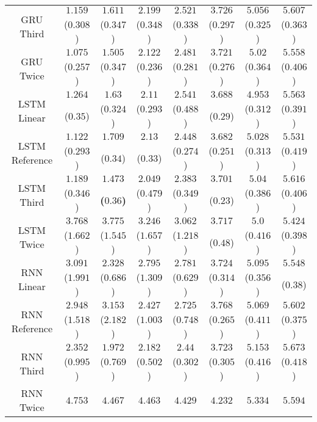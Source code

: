 \begin{table}[!ht]
{\begin{tabular}{|c|c|c|c|c|c|c|c|}
			\multirow{2}{*}{GRU Third} & $1.159$ & $1.611$ & $2.199$ & $2.521$ & $3.726$ & $5.056$ & $5.607$ \\
			 & ($0.308$) & ($0.347$) & ($0.348$) & ($0.338$) & ($0.297$) & ($0.325$) & ($0.363$) \\ \hline
			\multirow{2}{*}{GRU Twice} & $1.075$ & $1.505$ & $2.122$ & $2.481$ & $3.721$ & $5.02$ & $5.558$ \\
			 & ($0.257$) & ($0.347$) & ($0.236$) & ($0.281$) & ($0.276$) & ($0.364$) & ($0.406$) \\ \hline
			\multirow{2}{*}{LSTM Linear} & $1.264$ & $1.63$ & $2.11$ & $2.541$ & $3.688$ & $4.953$ & $5.563$ \\
			 & ($0.35$) & ($0.324$) & ($0.293$) & ($0.488$) & ($0.29$) & ($0.312$) & ($0.391$) \\ \hline
			\multirow{2}{*}{LSTM Reference} & $1.122$ & $1.709$ & $2.13$ & $2.448$ & $3.682$ & $5.028$ & $5.531$ \\
			 & ($0.293$) & ($0.34$) & ($0.33$) & ($0.274$) & ($0.251$) & ($0.313$) & ($0.419$) \\ \hline
			\multirow{2}{*}{LSTM Third} & $1.189$ & $\mathbf{1.473}$ & $2.049$ & $2.383$ & $3.701$ & $5.04$ & $5.616$ \\
			 & ($0.346$) & \textbf{(}$\mathbf{0.36}$\textbf{)} & ($0.479$) & ($0.349$) & ($0.23$) & ($0.386$) & ($0.406$) \\ \hline
			\multirow{2}{*}{LSTM Twice} & $3.768$ & $3.775$ & $3.246$ & $3.062$ & $3.717$ & $5.0$ & $5.424$ \\
			 & ($1.662$) & ($1.545$) & ($1.657$) & ($1.218$) & ($0.48$) & ($0.416$) & ($0.398$) \\ \hline
			\multirow{2}{*}{RNN Linear} & $3.091$ & $2.328$ & $2.795$ & $2.781$ & $3.724$ & $5.095$ & $5.548$ \\
			 & ($1.991$) & ($0.686$) & ($1.309$) & ($0.629$) & ($0.314$) & ($0.356$) & ($0.38$) \\ \hline
			\multirow{2}{*}{RNN Reference} & $2.948$ & $3.153$ & $2.427$ & $2.725$ & $3.768$ & $5.069$ & $5.602$ \\
			 & ($1.518$) & ($2.182$) & ($1.003$) & ($0.748$) & ($0.265$) & ($0.411$) & ($0.375$) \\ \hline
			\multirow{2}{*}{RNN Third} & $2.352$ & $1.972$ & $2.182$ & $2.44$ & $3.723$ & $5.153$ & $5.673$ \\
			 & ($0.995$) & ($0.769$) & ($0.502$) & ($0.302$) & ($0.305$) & ($0.416$) & ($0.418$) \\ \hline
			\multirow{2}{*}{RNN Twice} & $4.753$ & $4.467$ & $4.463$ & $4.429$ & $4.232$ & $5.334$ & $5.594$ \\

\end{tabular}}
\end{table}
